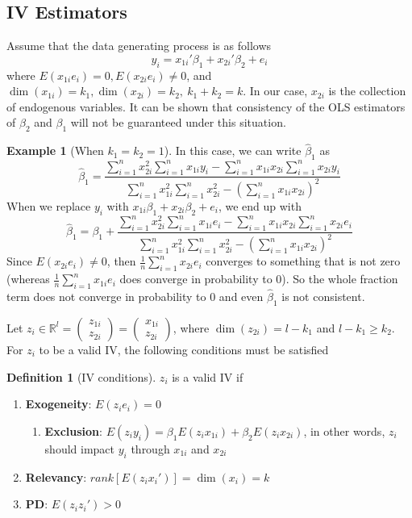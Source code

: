 \documentclass[12pt]{article}
\theoremstyle{definition}
\newtheorem{definition}{Definition}[section]
\theoremstyle{property}
\theoremstyle{assumption}
\theoremstyle{example}
\newtheorem{example}{Example}[section]
\theoremstyle{comment}
\begin{document}
\subsection{IV Estimators}
Assume that the data generating process is as follows
\[
y_i = x_{1i}'\beta_1+x_{2i}'\beta_2+e_i
\]
where $E(x_{1i}e_i)=0, E(x_{2i}e_i)\neq0$, and $\dim(x_{1i})=k_1, \dim(x_{2i})=k_2,\ k_1+k_2=k$. In our case, $x_{2i}$ is the collection of endogenous variables. It can be shown that consistency of the OLS estimators of $\beta_2$ and $\beta_1$ will not be guaranteed under this situation.
\begin{mdframed}[backgroundcolor=yellow!5] 
\begin{example}[When $k_1=k_2=1$]
In this case, we can write $\hat{\beta}_1$ as
\[
\hat{\beta}_1=\frac{\sum_{i=1}^n x_{2i}^2\sum_{i=1}^n x_{1i}y_i-\sum_{i=1}^n x_{1i}x_{2i}\sum_{i=1}^nx_{2i}y_i}{\sum_{i=1}^n x_{1i}^2\sum_{i=1}^nx_{2i}^2-(\sum_{i=1}^nx_{1i}x_{2i})^2}
\]
When we replace $y_i$ with $x_{1i}\beta_1+x_{2i}\beta_2+e_i$, we end up with
\[
\hat{\beta}_1=\beta_1+\frac{\sum_{i=1}^n x_{2i}^2\sum_{i=1}^n x_{1i}e_i-\sum_{i=1}^n x_{1i}x_{2i}\sum_{i=1}^nx_{2i}e_i}{\sum_{i=1}^n x_{1i}^2\sum_{i=1}^nx_{2i}^2-(\sum_{i=1}^nx_{1i}x_{2i})^2}
\]
Since $E(x_{2i}e_i)\neq0$, then $\frac{1}{n}\sum_{i=1}^nx_{2i}e_i$ converges to something that is not zero (whereas $\frac{1}{n}\sum_{i=1}^nx_{1i}e_i$ does converge in probability to 0). So the whole fraction term does not converge in probability to 0 and even $\hat{\beta}_1$ is not consistent. 
\end{example}
\end{mdframed}
\par
Let $z_i\in\mathbb{R}^l = \begin{pmatrix}z_{1i} \\ z_{2i}\end{pmatrix}=\begin{pmatrix}x_{1i} \\ z_{2i}\end{pmatrix}$, where $\dim(z_{2i})=l-k_1$ and $l-k_1\geq k_2$. For $z_i$ to be a valid IV, the following conditions must be satisfied
\begin{mdframed}[backgroundcolor=blue!5] 
\begin{definition}[IV conditions]
$z_i$ is a valid IV if
\begin{enumerate}
\item \textbf{Exogeneity}: $E(z_ie_i)=0$
\begin{enumerate}
\item \textbf{Exclusion}: $E(z_iy_i)=\beta_1E(z_ix_{1i})+\beta_2E(z_ix_{2i})$, in other words, $z_i$ should impact $y_i$ through $x_{1i}$ and $x_{2i}$
\end{enumerate}
\item \textbf{Relevancy}: $rank[E(z_ix_i')]=\dim(x_i)=k$
\item \textbf{PD}: $E(z_iz_i')>0$
\end{enumerate}
\end{definition}
\end{mdframed}
\end{document}
